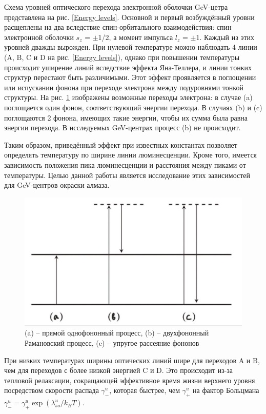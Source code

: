 Схема уровней оптического перехода электронной оболочки GeV-цетра представлена 
на рис. \ref{Energy levels}. Основной и первый возбуждённый уровни расщеплены на два вследствие
спин-орбитального взаимодействия: спин электронной оболочки $s_z$ = $\pm$1/2,
а момент импульса $l_z$ = $\pm$1. Каждый из этих уровней дважды вырожден.
При нулевой температуре можно наблюдать
4 линии (A, B, C и D на рис. \ref{Energy levels}), однако при повышении температуры
происходит уширение линий вследствие эффекта Яна-Теллера, и линии тонких структур
перестают быть различимыми. Этот эффект
проявляется в поглощении или испускании фонона при переходе электрона между
подуровнями тонкой структуры. На рис. \ref{J-T effect} изображены возможные переходы электрона:
в случае (a) поглощается один фонон, соответствующий энергии перехода. В случаях
(b) и (c) поглощаются 2 фонона, имеющих такие энергии, чтобы их сумма была 
равна энергии перехода. В исследуемых GeV-центрах процесс (b) не происходит.

Таким образом, приведённый эффект при известных константах позволяет определять 
температуру по ширине линии люминесценции. Кроме того, имеется зависимость 
положения пика люминесценции и расстояния между пиками от температуры. Целью
данной работы является исследование этих зависимостей для GeV-центров окраски 
алмаза.  

\begin{figure}[!h]
    \begin{center}
        \includegraphics[width=0.5 \linewidth]{Jahn-Teller effect.jpg}
        \caption{(a) -- прямой однофононный процесс, (b) -- двухфононный
        Рамановский процесс, (c) -- упругое рассеяние фононов}
        \label{J-T effect}
    \end{center}
\end{figure}

При низких температурах ширины оптических линий шире для переходов A и B,
чем для переходов с более низкой энергией C и D. Это происходит из-за 
тепловой релаксации, сокращающей эффективное время жизни верхнего уровня
посредством скорости распада $\gamma_{-}^u$, которая быстрее, чем 
$\gamma_{+}^u$ на фактор Больцмана $\gamma_{-}^u = \gamma_{+}^u 
\exp(\lambda_{so}^u / k_B T)$.

